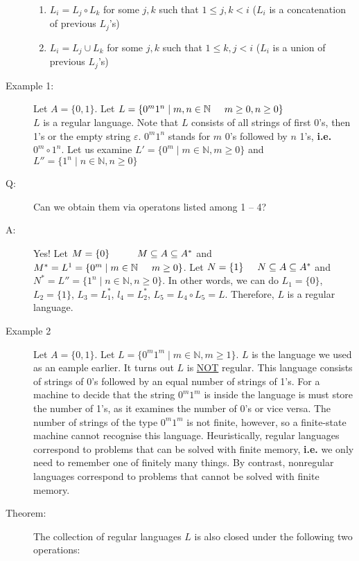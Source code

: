 \documentclass[10pt]{article}
\begin{document}
\begin{description}
\begin{enumerate}
			\item $L_i = L_j \circ L_k$ for some $j, k$ such that $1 \leq j, k < i$ ($L_i$ is a concatenation of previous $L_j$'s)
			\item $L_i = L_j \cup L_k$ for some $j, k$ such that $1 \leq k, j < i$ ($L_i$ is a union of previous $L_j$'s)
		\end{enumerate}
		\item[Example 1:] Let $A = \{0, 1\}$. Let $L = \{0^m 1^n \mid m, n \in \mathbb{N} \hspace{5mm} m \geq 0, n \geq 0 \}$ \\
		$L$ is a regular language. Note that $L$ consists of all strings of first 0's, then 1's or the empty string $\varepsilon$. $0^m1^n$ stands for $m$ 0's followed by $n$ 1's, \textbf{i.e.} $0^m \circ 1^n$. Let us examine $L' = \{0^m \mid m \in \mathbb{N}, m \geq 0 \}$ and $L'' = \{1^n \mid n \in \mathbb{N}, n \geq 0 \}$
		\item[Q:] Can we obtain them via operatons listed among 1 -- 4?
		\item[A:] Yes! Let $M = \{ 0 \} \hspace{10mm} M \subseteq A \subseteq A^*$ and $M^* = L^1 = \{0^m \mid m \in \mathbb{N} \hspace{5mm} m \geq 0 \}$. Let $N = \{1\} \hspace{5mm} N \subseteq A \subseteq A^*$ and $N^* = L'' = \{1^n \mid n \in \mathbb{N}, n \geq 0 \}$. In other words, we can do $L_1 = \{0\}$, $L_2 = \{1\}$, $L_3 = L_1^*$, $l_4 = L_2^*$, $L_5 = L_4 \circ L_5 = L$. Therefore, $L$ is a regular language.
		\item[Example 2] Let $A = \{0, 1\}$. Let $L = \{0^m1^m \mid m \in \mathbb{N}, m \geq 1 \}$. $L$ is the language we used as an eample earlier. It turns out $L$ is \underline{NOT} regular. This language consists of strings of 0's followed by an equal number of strings of 1's. For a machine to decide that the string $0^m1^m$ is  inside the language is must store the number of 1's, as it examines the number of 0's or vice versa. The number of strings of the type $0^m1^m$ is not finite, however, so a finite-state machine cannot recognise this language. Heuristically, regular languages correspond to problems that can be solved with finite memory, \textbf{i.e.} we only need to remember one of finitely many things. By contrast, nonregular languages correspond to problems that cannot be solved with finite memory.
		\item[Theorem:] The collection of regular languages $L$ is also closed under the following two operations:

\end{description}
\end{document}
